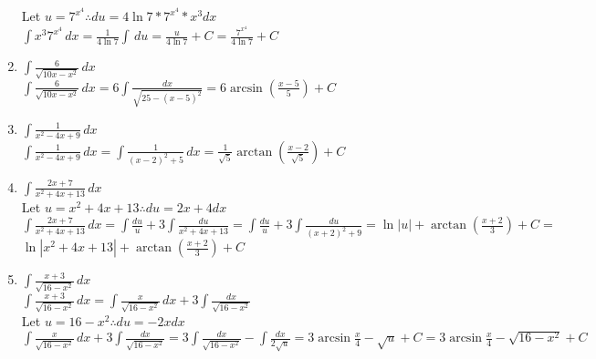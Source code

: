 \documentclass[10pt, letterpaper]{report}
\begin{document}
\begin{enumerate}
    Let $u=7^{x^{4}}\therefore du=4\ln{7}*7^{x^{4}}*x^{3}dx$ \\

    $\int{x^{3}7^{x^{4}}}\,dx=
    \frac{1}{4\ln{7}}\int{}\,du=
    \frac{u}{4\ln{7}}+C=\frac{7^{x^{4}}}{4\ln{7}}+C$ \\

  \item{$\int{\frac{6}{\sqrt{10x-x^{2}}}}\,dx$} \\

    $\int{\frac{6}{\sqrt{10x-x^{2}}}}\,dx=6\int{\frac{dx}{\sqrt{25-(x-5)^{2}}}}=
    6\arcsin{\left(\frac{x-5}{5}\right)}+C$ \\

  \item{$\int{\frac{1}{x^{2}-4x+9}}\,dx$} \\

    $\int{\frac{1}{x^{2}-4x+9}}\,dx=
    \int{\frac{1}{(x-2)^{2}+5}}\,dx=
    \frac{1}{\sqrt{5}}\arctan{\left(\frac{x-2}{\sqrt{5}}\right)}+C$ \\

  \item{$\int{\frac{2x+7}{x^{2}+4x+13}}\,dx$} \\

    Let $u=x^{2}+4x+13\therefore du=2x+4dx$ \\

    $\int{\frac{2x+7}{x^{2}+4x+13}}\,dx=\int{\frac{du}{u}}+3\int{\frac{du}{x^{2}+4x+13}}=
    \int{\frac{du}{u}}+3\int{\frac{du}{(x+2)^{2}+9}}=\ln{|u|}+\arctan{\left(\frac{x+2}{3}\right)}+C=$ \\

    $\ln{|x^{2}+4x+13|}+\arctan{\left(\frac{x+2}{3}\right)}+C$ \\

  \item{$\int{\frac{x+3}{\sqrt{16-x^{2}}}}\,dx$} \\

    $\int{\frac{x+3}{\sqrt{16-x^{2}}}}\,dx=
    \int{\frac{x}{\sqrt{16-x^{2}}}}\,dx+3\int{\frac{dx}{\sqrt{16-x^{2}}}}$ \\

    Let $u=16-x^{2}\therefore du=-2xdx$ \\

    $\int{\frac{x}{\sqrt{16-x^{2}}}}\,dx+3\int{\frac{dx}{\sqrt{16-x^{2}}}}=
    3\int{\frac{dx}{\sqrt{16-x^{2}}}}-\int{\frac{dx}{2\sqrt{u}}}=
    3\arcsin{\frac{x}{4}}-\sqrt{u}+C=
    3\arcsin{\frac{x}{4}}-\sqrt{16-x^{2}}+C$ \\


\end{enumerate}
\end{document}
